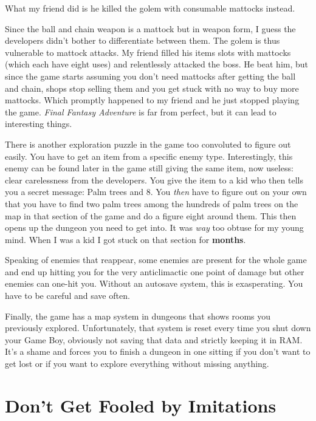 \documentclass{book}
\begin{document}
What my friend did is he killed the golem with consumable mattocks instead.

Since the ball and chain weapon is a mattock but in weapon form, I guess the developers didn’t bother to differentiate between them. The golem is thus vulnerable to mattock attacks. My friend filled his items slots with mattocks (which each have eight uses) and relentlessly attacked the boss. He beat him, but since the game starts assuming you don’t need mattocks after getting the ball and chain, shops stop selling them and you get stuck with no way to buy more mattocks. Which promptly happened to my friend and he just stopped playing the game. \emph{Final Fantasy Adventure} is far from perfect, but it can lead to interesting things.

There is another exploration puzzle in the game too convoluted to figure out easily. You have to get an item from a specific enemy type. Interestingly, this enemy can be found later in the game still giving the same item, now useless: clear carelessness from the developers. You give the item to a kid who then tells you a secret message: Palm trees and 8. You \emph{then} have to figure out on your own that you have to find two palm trees among the hundreds of palm trees on the map in that section of the game and do a figure eight around them. This then opens up the dungeon you need to get into. It was \emph{way} too obtuse for my young mind. When I was a kid I got stuck on that section for \textbf{months}.

Speaking of enemies that reappear, some enemies are present for the whole game and end up hitting you for the very anticlimactic one point of damage but other enemies can one-hit you. Without an autosave system, this is exasperating. You have to be careful and save often.

Finally, the game has a map system in dungeons that shows rooms you previously explored. Unfortunately, that system is reset every time you shut down your Game Boy, obviously not saving that data and strictly keeping it in RAM. It’s a shame and forces you to finish a dungeon in one sitting if you don’t want to get lost or if you want to explore everything without missing anything.

\FloatBarrier\needspace{5pt}\section*{Don’t Get Fooled by Imitations}\nopagebreak[4]
\end{document}
